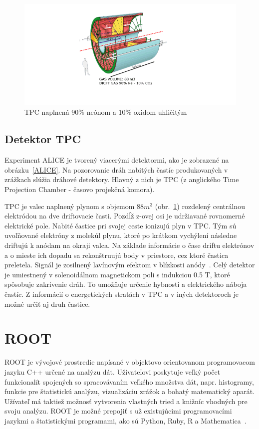 \documentclass[thesismargins, thesislinespacing]{rnthesis}
\begin{document}
\begin{figure}[hbtp!]
	\begin{center}
		\includegraphics[width=\textwidth]{./Obrazky_praca/tpc.png}
		\caption{TPC naplnená 90\% neónom a 10\% oxidom uhličitým~\cite{TPCobr}}
		\label{tpc}
	\end{center}
\end{figure}

\subsection{Detektor TPC}
\label{textTPC}
Experiment ALICE je tvorený viacerými detektormi, ako je zobrazené na obrázku~\ref{ALICE}. Na pozorovanie dráh nabitých častíc produkovaných v zrážkach slúžia dráhové detektory. Hlavný z nich je TPC (z anglického Time Projection Chamber - časovo projekčná komora).

TPC je valec naplnený plynom s objemom $88m^3$ (obr.~\ref{tpc}) rozdelený centrálnou elektródou na dve driftovacie časti. Pozdĺž z-ovej osi je udržiavané rovnomerné elektrické pole. Nabité častice pri svojej ceste ionizujú plyn v TPC. Tým sú uvoľňované elektróny z molekúl plynu, ktoré po krátkom vychýlení následne driftujú k anódam na okraji valca. Na základe informácie o čase driftu elektrónov a o mieste ich dopadu sa rekonštruujú body v priestore, cez ktoré častica preletela. Signál je zosilnený lavínovým efektom v blízkosti anódy~\cite{alice1}. Celý detektor je umiestnený v solenoidálnom magnetickom poli s indukciou 0.5 T, ktoré spôsobuje zakrivenie dráh. To umožňuje určenie hybnosti a elektrického náboja častíc. Z informácií o energetických stratách v TPC a v iných detektoroch je možné určiť aj druh častice. 

\section{ROOT}
ROOT je vývojové prostredie napísané v objektovo orientovanom programovacom jazyku C++ určené na analýzu dát. Užívateľovi poskytuje veľký počet funkcionalít spojených so spracovávaním veľkého množstva dát, napr. histogramy, funkcie pre štatistickú analýzu, vizualizáciu zrážok a bohatý matematický aparát. Užívateľ má taktiež možnosť vytvorenia vlastných tried a knižníc vhodných pre svoju analýzu. ROOT je možné prepojiť s už existujúcimi programovacími jazykmi a štatistickými programami, ako sú Python, Ruby, R a Mathematica~\cite{root}.
\end{document}
